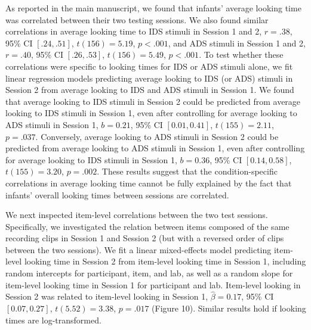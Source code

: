 \documentclass[
  man, donotrepeattitle,floatsintext]{apa6}
\begin{document}
As reported in the main manuscript, we found that infants' average looking time was correlated between their two testing sessions.
We also found similar correlations in average looking time to IDS stimuli in Session 1 and 2, \(r = .38\), 95\% CI \([.24, .51]\), \(t(156) = 5.19\), \(p < .001\), and ADS stimuli in Session 1 and 2, \(r = .40\), 95\% CI \([.26, .53]\), \(t(156) = 5.49\), \(p < .001\).
To test whether these correlations were specific to looking times for IDS or ADS stimuli alone, we fit linear regression models predicting average looking to IDS (or ADS) stimuli in Session 2 from average looking to IDS and ADS stimuli in Session 1.
We found that average looking to IDS stimuli in Session 2 could be predicted from average looking to IDS stimuli in Session 1, even after controlling for average looking to ADS stimuli in Session 1, \(b = 0.21\), 95\% CI \([0.01, 0.41]\), \(t(155) = 2.11\), \(p = .037\).
Conversely, average looking to ADS stimuli in Session 2 could be predicted from average looking to ADS stimuli in Session 1, even after controlling for average looking to IDS stimuli in Session 1, \(b = 0.36\), 95\% CI \([0.14, 0.58]\), \(t(155) = 3.20\), \(p = .002\).
These results suggest that the condition-specific correlations in average looking time cannot be fully explained by the fact that infants' overall looking times between sessions are correlated.

We next inspected item-level correlations between the two test sessions.
Specifically, we investigated the relation between items composed of the same recording clips in Session 1 and Session 2 (but with a reversed order of clips between the two sessions).
We fit a linear mixed-effects model predicting item-level looking time in Session 2 from item-level looking time in Session 1, including random intercepts for participant, item, and lab, as well as a random slope for item-level looking time in Session 1 for participant and lab.
Item-level looking in Session 2 was related to item-level looking in Session 1, \(\hat{\beta} = 0.17\), 95\% CI \([0.07, 0.27]\), \(t(5.52) = 3.38\), \(p = .017\) (Figure 10).
Similar results hold if looking times are log-transformed.
\end{document}
